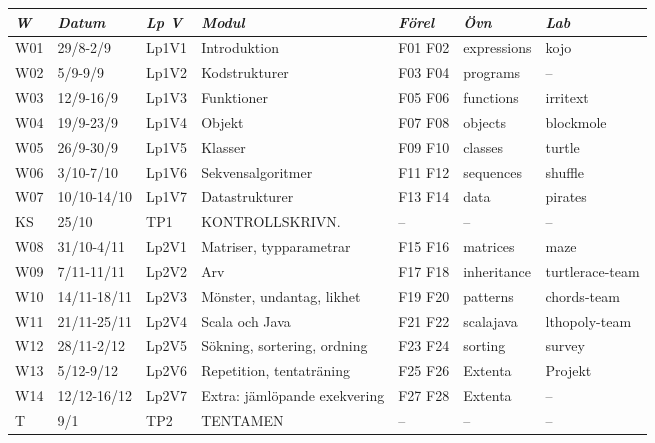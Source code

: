 \begin{tabular}{l|l|l|l|l|l|l}
\textit{W} & \textit{Datum} & \textit{Lp V} & \textit{Modul} & \textit{Förel} & \textit{Övn} & \textit{Lab} \\ \hline \hline
W01 & 29/8-2/9 & Lp1V1 & Introduktion & F01 F02 & expressions & kojo \\
W02 & 5/9-9/9 & Lp1V2 & Kodstrukturer & F03 F04 & programs & -- \\
W03 & 12/9-16/9 & Lp1V3 & Funktioner & F05 F06 & functions & irritext \\
W04 & 19/9-23/9 & Lp1V4 & Objekt & F07 F08 & objects & blockmole \\
W05 & 26/9-30/9 & Lp1V5 & Klasser & F09 F10 & classes & turtle \\
W06 & 3/10-7/10 & Lp1V6 & Sekvensalgoritmer & F11 F12 & sequences & shuffle \\
W07 & 10/10-14/10 & Lp1V7 & Datastrukturer & F13 F14 & data & pirates \\
KS & 25/10 & TP1 & KONTROLLSKRIVN. & -- & -- & -- \\
W08 & 31/10-4/11 & Lp2V1 & Matriser, typparametrar & F15 F16 & matrices & maze \\
W09 & 7/11-11/11 & Lp2V2 & Arv & F17 F18 & inheritance & turtlerace-team \\
W10 & 14/11-18/11 & Lp2V3 & Mönster, undantag, likhet & F19 F20 & patterns & chords-team \\
W11 & 21/11-25/11 & Lp2V4 & Scala och Java & F21 F22 & scalajava & lthopoly-team \\
W12 & 28/11-2/12 & Lp2V5 & Sökning, sortering, ordning & F23 F24 & sorting & survey \\
W13 & 5/12-9/12 & Lp2V6 & Repetition, tentaträning & F25 F26 & Extenta & Projekt \\
W14 & 12/12-16/12 & Lp2V7 & Extra: jämlöpande exekvering & F27 F28 & Extenta & -- \\
T & 9/1 & TP2 & TENTAMEN & -- & -- & -- \\
\end{tabular}
